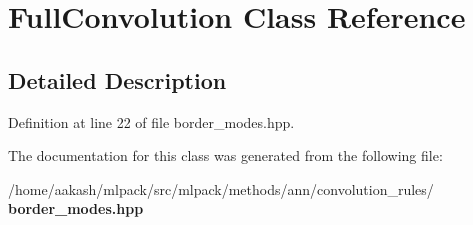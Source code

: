 \section{Full\+Convolution Class Reference}
\label{classmlpack_1_1ann_1_1FullConvolution}


\subsection{Detailed Description}


Definition at line 22 of file border\+\_\+modes.\+hpp.



The documentation for this class was generated from the following file\+:\begin{DoxyCompactItemize}
\item 
/home/aakash/mlpack/src/mlpack/methods/ann/convolution\+\_\+rules/\textbf{ border\+\_\+modes.\+hpp}\end{DoxyCompactItemize}
